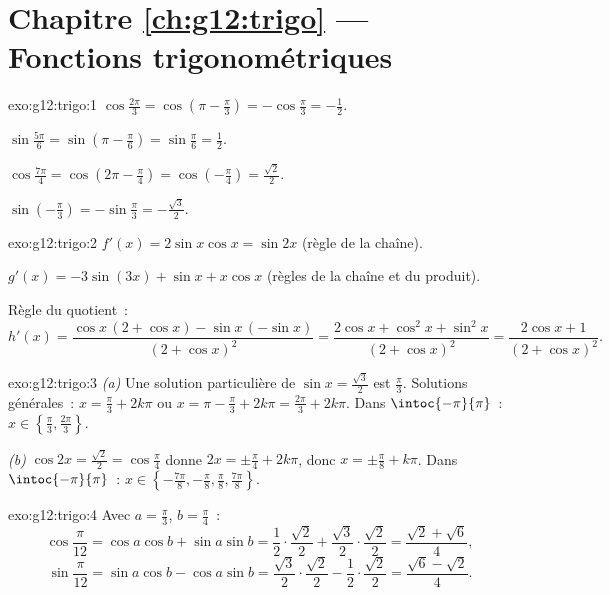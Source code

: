 \section*{Chapitre \ref{ch:g12:trigo} --- Fonctions trigonométriques}

\begin{solution}{exo:g12:trigo:1}
$\cos\frac{2\pi}{3} = \cos\left(\pi - \frac\pi3\right) = -\cos\frac\pi3
= -\frac12$.

$\sin\frac{5\pi}{6} = \sin\left(\pi - \frac\pi6\right) = \sin\frac\pi6
= \frac12$.

$\cos\frac{7\pi}{4} = \cos\left(2\pi - \frac{\pi}{4}\right)
= \cos\left(-\frac\pi4\right) = \frac{\sqrt2}{2}$.

$\sin\left(-\frac\pi3\right) = -\sin\frac\pi3 = -\frac{\sqrt3}{2}$.
\end{solution}

\begin{solution}{exo:g12:trigo:2}
$f'(x) = 2\sin x\cos x = \sin 2x$ (règle de la chaîne).

$g'(x) = -3\sin(3x) + \sin x + x\cos x$ (règles de la chaîne et du
produit).

Règle du quotient~:
\[
h'(x) = \frac{\cos x\,(2 + \cos x) - \sin x\,(-\sin x)}{(2+\cos x)^2}
= \frac{2\cos x + \cos^2 x + \sin^2 x}{(2+\cos x)^2}
= \frac{2\cos x + 1}{(2+\cos x)^2}.
\]
\end{solution}

\begin{solution}{exo:g12:trigo:3}
\emph{(a)} Une solution particulière de $\sin x = \frac{\sqrt3}{2}$ est
$\frac\pi3$. Solutions générales~: $x = \frac\pi3 + 2k\pi$ ou
$x = \pi - \frac\pi3 + 2k\pi = \frac{2\pi}{3} + 2k\pi$. Dans
$\intoc{-\pi}{\pi}$~: $x \in \left\{\frac\pi3, \frac{2\pi}{3}\right\}$.

\emph{(b)} $\cos 2x = \frac{\sqrt2}{2} = \cos\frac\pi4$ donne
$2x = \pm\frac\pi4 + 2k\pi$, donc $x = \pm\frac\pi8 + k\pi$. Dans
$\intoc{-\pi}{\pi}$~:
$x \in \left\{-\frac{7\pi}{8}, -\frac\pi8, \frac\pi8, \frac{7\pi}{8}\right\}$.
\end{solution}

\begin{solution}{exo:g12:trigo:4}
Avec $a = \frac\pi3$, $b = \frac\pi4$~:
\[
\cos\frac{\pi}{12} = \cos a\cos b + \sin a \sin b
= \frac12\cdot\frac{\sqrt2}{2} + \frac{\sqrt3}{2}\cdot\frac{\sqrt2}{2}
= \frac{\sqrt2 + \sqrt6}{4},
\]
\[
\sin\frac{\pi}{12} = \sin a\cos b - \cos a \sin b
= \frac{\sqrt3}{2}\cdot\frac{\sqrt2}{2} - \frac12\cdot\frac{\sqrt2}{2}
= \frac{\sqrt6 - \sqrt2}{4}.
\]
\end{solution}

